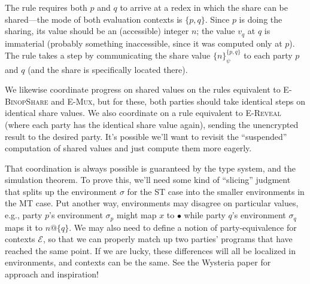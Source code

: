 \documentclass[10pt]{article}
\makeatletter
\newcommand{\rulelab}[1]{{\small \textsc{#1}}}
\newcommand{\kw}[1]{\ensuremath{\mathtt{#1}}}
\newcommand{\ebinop}[2]{\ensuremath{{#1}~\oplus~{#2}}}
\newcommand{\ereveal}[4]{\ensuremath{\kw{reveal}^{#1}_{#4}~{#2}~{#3}}}
\newcommand{\eshare}[4]{\ensuremath{\kw{share}^{#2}_{#1}~{#3}~{#4}}}
\newcommand{\vshare}[3]{\ensuremath{\{{#3}\}^{#1}_{#2}}}
\newcommand{\vloc}[2]{\ensuremath{{#1}\kw{@}{#2}}}
\newcommand{\vcrash}{\ensuremath{\bullet}}
\newcommand{\env}{\ensuremath{\sigma}}
\newcommand{\ctxt}{\ensuremath{\mathcal{E}}}
\makeatother
\begin{document}
The rule requires both $p$ and $q$ to arrive at a redex in which the
share can be shared---the mode of both evaluation contexts is
$\{p,q\}$. Since $p$ is doing the sharing, its value should be an
(accessible) integer $n$; the value $v_q$ at $q$ is immaterial
(probably something inaccessible, since it was computed only at $p$).
The rule takes a step by communicating the share
value $\vshare{\{p,q\}}{\psi}{n}$ to each party $p$ and $q$ (and the
share is specifically located there).

We likewise coordinate progress on shared values on the rules
equivalent to \rulelab{E-BinopShare} and \rulelab{E-Mux}, but for
these, both parties should take identical steps on identical share
values. We also coordinate on a rule equivalent to \rulelab{E-Reveal}
(where each party has the identical share value again), sending the
unencrypted result to the desired party. It's possible we'll want to
revisit the ``suspended'' computation of shared values and just
compute them more eagerly.

That coordination is always possible is guaranteed by the type system,
and the simulation theorem. To prove this, we'll need some kind of
``slicing'' judgment that splits up the environment $\env$ for the ST
case into the smaller environments in the MT case. Put another way,
environments may disagree on particular values, e.g., party $p$'s
environment $\env_p$ might map $x$ to $\vcrash$ while party $q$'s
environment $\env_q$ maps it to $\vloc{n}{\{q\}}$. We may also need to
define a notion of party-equivalence for contexts $\ctxt$, so that we
can properly match up two parties' programs that have reached the same
point. If we are lucky, these differences will all be localized in
environments, and contexts can be the same. See the Wysteria paper for
approach and inspiration!

\end{document}
